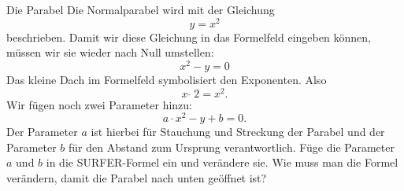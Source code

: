 \begin{surferPage}[Parabel]{Die Parabel}
Die Normalparabel wird mit der Gleichung \[y=x^2\] beschrieben.
Damit wir diese Gleichung in das Formelfeld eingeben können, müssen wir sie wieder nach Null umstellen:
\[x^2-y=0\]
Das kleine Dach im Formelfeld symbolisiert den Exponenten. Also 
\[ x  \,\hat{\ } \, 2 =x^2.\]
Wir fügen noch zwei Parameter hinzu:
\[a \cdot x^2-y+b=0.\]
Der Parameter $a$ ist hierbei für Stauchung und Streckung der Parabel und der Parameter $b$ für den Abstand zum Ursprung verantwortlich.
\newline
F\"uge die Parameter $a$ und $b$ in die SURFER-Formel ein und ver\"andere sie. Wie muss man die Formel verändern, damit die Parabel nach unten geöffnet ist?
\end{surferPage}
